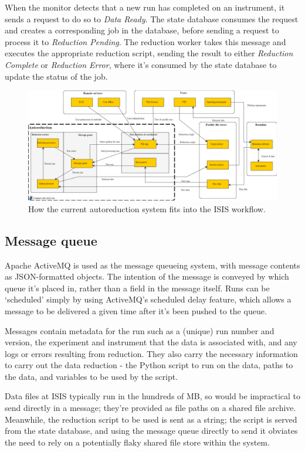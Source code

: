 \documentclass[twocolumn]{article}
\begin{document}
When the monitor detects that a new run has completed on an instrument, it sends a
request to do so to \emph{Data Ready}. The state database consumes the
request and creates a corresponding job in the database, before
sending a request to process it to \emph{Reduction Pending}. The reduction
worker takes this message and executes the appropriate reduction script, sending the
result to either \emph{Reduction Complete} or \emph{Reduction Error},
where it's consumed by the state database to update the status of the
job.

\begin{figure}
\centering\includegraphics[width=1.15\linewidth,angle=90,origin=c]{system.png}
\caption{How the current autoreduction system fits into the ISIS workflow.}
\end{figure}

\subsection{Message queue}\label{message-queue}

Apache ActiveMQ\cite{activemq} is used as the message queueing system, with
message contents as JSON-formatted objects. The intention of the message
is conveyed by which queue it's placed in, rather than a field in the
message itself. Runs can be `scheduled' simply by using ActiveMQ's
scheduled delay feature, which allows a message to be delivered a given
time after it's been pushed to the queue.

Messages contain metadata for the run such as a (unique) run number and
version, the experiment and instrument that the data is associated with,
and any logs or errors resulting from reduction. They also carry the
necessary information to carry out the data reduction - the Python
script to run on the data, paths to the data, and variables to be used
by the script.

Data files at ISIS typically run in the hundreds of MB, so would be
impractical to send directly in a message; they're provided as file
paths on a shared file archive. Meanwhile, the reduction script to be
used is sent as a string; the script is served from the state database,
and using the message queue directly to send it obviates the need to
rely on a potentially flaky shared file store within the system.
\end{document}
